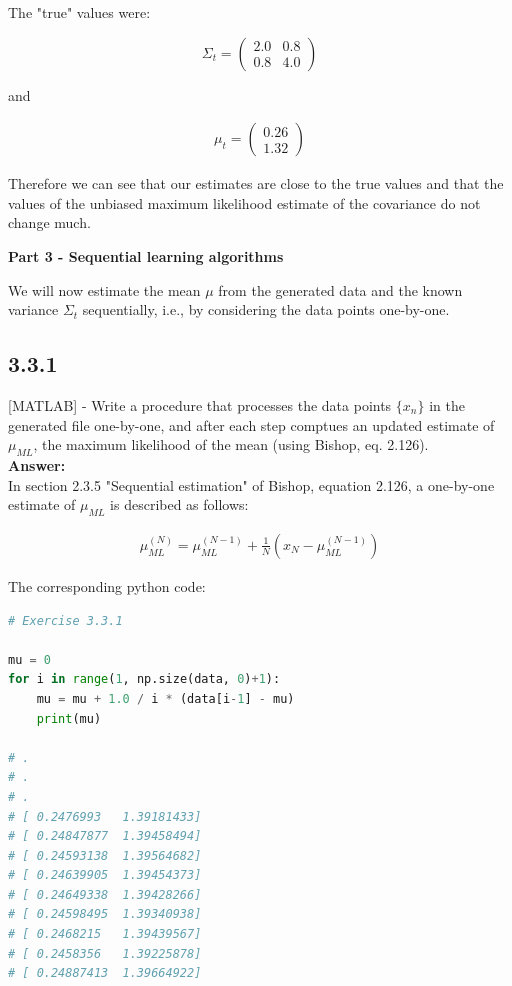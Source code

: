 \documentclass[a4paper]{article}
\begin{document}
The "true" values were:

\[ \Sigma_t = \left( \begin{array}{cc}
2.0 & 0.8  \\
0.8 & 4.0 \end{array} \right)\] 

and 

\begin{align*}
	\mu_t = \begin{pmatrix}0.26 \\ 1.32 \end{pmatrix}
\end{align*}

\vspace{1em}

Therefore we can see that our estimates are close to the true values and that the values of the unbiased maximum likelihood estimate of the covariance do not change much.

\vspace{1em}

\textbf{Part 3 - Sequential learning algorithms}

We will now estimate the mean $\mu$ from the generated data and the known variance $\Sigma_t$ sequentially, i.e., by considering the data points one-by-one.

\subsection*{3.3.1}

[MATLAB] - Write a procedure that processes the data points $\{ x_n \}$ in the generated file one-by-one, and after each step comptues an updated estimate of $\mu_{ML}$, the maximum likelihood of the mean (using Bishop, eq. 2.126).\\


\textbf{Answer:}\\

In section 2.3.5 "Sequential estimation" of Bishop, equation 2.126, a one-by-one estimate of $\mu_{ML}$ is described as follows:

\begin{align*}
\mu^{(N)}_{ML} = \mu^{(N-1)}_{ML} + \frac{1}{N} (x_N - \mu^{(N-1)}_{ML})
\end{align*}

The corresponding python code:

\begin{lstlisting}[language=Python]
# Exercise 3.3.1

mu = 0
for i in range(1, np.size(data, 0)+1):
    mu = mu + 1.0 / i * (data[i-1] - mu)
    print(mu)

# .
# .
# .
# [ 0.2476993   1.39181433]
# [ 0.24847877  1.39458494]
# [ 0.24593138  1.39564682]
# [ 0.24639905  1.39454373]
# [ 0.24649338  1.39428266]
# [ 0.24598495  1.39340938]
# [ 0.2468215   1.39439567]
# [ 0.2458356   1.39225878]
# [ 0.24887413  1.39664922]
\end{lstlisting}
\end{document}

